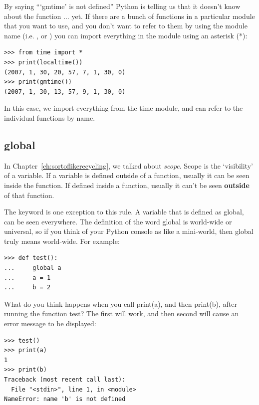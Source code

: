 By saying ```gmtime' is not defined'' Python is telling us that it doesn't know about the function $\ldots$ yet. If there are a bunch of functions in a particular module that you want to use, and you don't want to refer to them by using the module name (i.e. , or ) you can import everything in the module using an asterisk (*):

\begin{listingignore}
\begin{verbatim}
>>> from time import *
>>> print(localtime())
(2007, 1, 30, 20, 57, 7, 1, 30, 0)
>>> print(gmtime())
(2007, 1, 30, 13, 57, 9, 1, 30, 0)
\end{verbatim}
\end{listingignore}

In this case, we import everything from the time module, and can refer to the individual functions by name.

\subsection*{global}

In Chapter~\ref{ch:sortoflikerecycling}, we talked about \emph{scope}.  Scope is the `visibility' of a variable. If a variable is defined outside of a function, usually it can be seen inside the function. If defined inside a function, usually it can't be seen \textbf{outside} of that function.
\par
The  keyword is one exception to this rule. A variable that is defined as global, can be seen everywhere. The definition of the word global is world-wide or universal, so if you think of your Python console as like a mini-world, then global truly means world-wide.  For example:

\begin{listing}
\begin{verbatim}
>>> def test():
...     global a
...     a = 1
...     b = 2
\end{verbatim}
\end{listing}

What do you think happens when you call print(a), and then print(b), after running the function test?  The first will work, and then second will cause an error message to be displayed:

\begin{listing}
\begin{verbatim}
>>> test()
>>> print(a)
1
>>> print(b)
Traceback (most recent call last):
  File "<stdin>", line 1, in <module>
NameError: name 'b' is not defined
\end{verbatim}
\end{listing}

